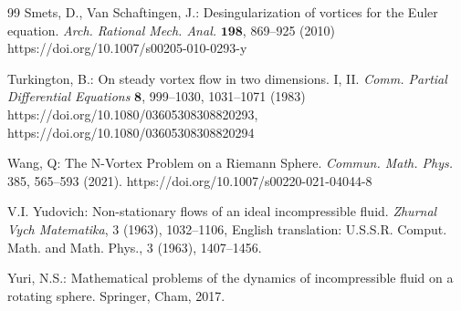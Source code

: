 \documentclass[12pt,reqno]{amsart}
\numberwithin{equation}{section}
\theoremstyle{definition}
\theoremstyle{remark}
\begin{document}
\begin{thebibliography}{99}
	Smets, D., Van Schaftingen, J.: Desingularization of vortices for the Euler equation.
	\textit{Arch. Rational Mech. Anal.} $\boldsymbol{198}$, 869--925 (2010) https://doi.org/10.1007/s00205-010-0293-y
	
	Turkington, B.: On steady vortex flow in two dimensions. I, II.
	\textit{Comm. Partial Differential Equations} $\boldsymbol{8}$, 999--1030, 1031--1071 (1983) https://doi.org/10.1080/03605308308820293, https://doi.org/10.1080/03605308308820294
	
	Wang, Q: The N-Vortex Problem on a Riemann Sphere. \textit{Commun. Math. Phys.} 385, 565--593 (2021). https://doi.org/10.1007/s00220-021-04044-8
	
	V.I. Yudovich: Non-stationary flows of an ideal incompressible fluid.
	\textit{Zhurnal Vych Matematika}, 3 (1963), 1032--1106, English translation: U.S.S.R. Comput. Math. and Math. Phys., 3 (1963), 1407--1456.
	
	Yuri, N.S.: Mathematical problems of the dynamics of incompressible fluid on a rotating sphere. Springer, Cham, 2017.
	
   \end{thebibliography}
	
	
\end{document}
